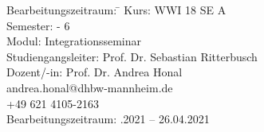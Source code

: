 \begin{titlepage}
    
    
        \begin{minipage}{\textwidth}
    
            \begin{tabbing}
                
                Bearbeitungszeitraum: \hspace{0.85cm}\=\kill
                Kurs: \> WWI 18 SE A \\[1.5mm]
                Semester:  - 6 \\[1.5mm]
                Modul: \> Integrationsseminar \\[1.5mm]
                Studiengangsleiter: \> Prof. Dr. Sebastian Ritterbusch  \\[1.5mm]
                Dozent/-in: \> Prof. Dr. Andrea Honal \\
                \> andrea.honal@dhbw-mannheim.de \\
                \> +49 621 4105-2163 \\[1.5mm]
                Bearbeitungszeitraum: .2021 -- 26.04.2021
               
            \end{tabbing}
    
    \end{minipage}
    
\end{titlepage}